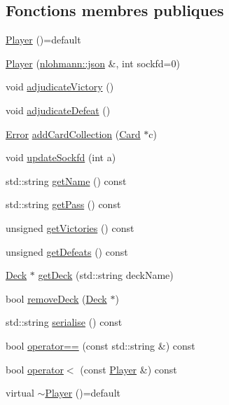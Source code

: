 \subsection*{Fonctions membres publiques}
\begin{DoxyCompactItemize}
\item 
\hyperlink{classPlayer_aaa23b3bf80e8c0267cf08d4fe4d6ddc1}{Player} ()=default
\item 
\hyperlink{classPlayer_a9e88d178553a82a6c7406b8ff78e1beb}{Player} (\hyperlink{CardManager_8hpp_ab701e3ac61a85b337ec5c1abaad6742d}{nlohmann\+::json} \&, int sockfd=0)
\item 
void \hyperlink{classPlayer_a224828ffebbc85cda6a370eb7fab7332}{adjudicate\+Victory} ()
\item 
void \hyperlink{classPlayer_a882d9db35e3277bcd2db52fa9eca7dfb}{adjudicate\+Defeat} ()
\item 
\hyperlink{Error_8hpp_a2c3e4bb40f36b262a5214e2da2bca9c5}{Error} \hyperlink{classPlayer_ad6b7d88cbcd56aeb046c154fdedeb52e}{add\+Card\+Collection} (\hyperlink{classCard}{Card} $\ast$c)
\item 
void \hyperlink{classPlayer_adf7cea3607c835e1c32f054524cd3027}{update\+Sockfd} (int a)
\item 
std\+::string \hyperlink{classPlayer_ad4c6a95f1cf69c44d0c585465b101c70}{get\+Name} () const 
\item 
std\+::string \hyperlink{classPlayer_a244625f85468369c2dd4115d10dd96c0}{get\+Pass} () const 
\item 
unsigned \hyperlink{classPlayer_a6cce4ff00f12069ee17a0c8d8be7912a}{get\+Victories} () const 
\item 
unsigned \hyperlink{classPlayer_ac8d227b243a10660a092e289365d4f13}{get\+Defeats} () const 
\item 
\hyperlink{classDeck}{Deck} $\ast$ \hyperlink{classPlayer_a24e81b3a057a93babe3ff469d59cecd3}{get\+Deck} (std\+::string deck\+Name)
\item 
bool \hyperlink{classPlayer_af7f21437111ed192905e76777e1cfcff}{remove\+Deck} (\hyperlink{classDeck}{Deck} $\ast$)
\item 
std\+::string \hyperlink{classPlayer_a03a285ddda49ed0c0383b39a0a5f415b}{serialise} () const 
\item 
bool \hyperlink{classPlayer_ad595a59902a36610d2aa8d496a071f1f}{operator==} (const std\+::string \&) const 
\item 
bool \hyperlink{classPlayer_ab8344f240fbc64e17012fea952bf5821}{operator$<$} (const \hyperlink{classPlayer}{Player} \&) const 
\item 
virtual \hyperlink{classPlayer_a11017c0ed8a639f3b1308ab167fbeca2}{$\sim$\+Player} ()=default
\end{DoxyCompactItemize}
